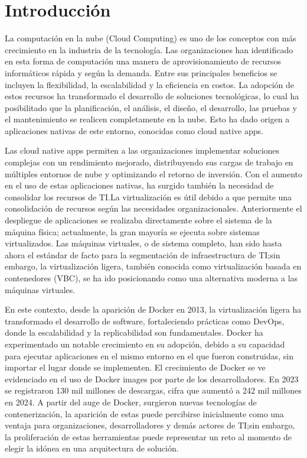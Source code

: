 \chapter*{Introducción}
La computación en la nube (Cloud Computing) es uno de los conceptos con más crecimiento en la industria de la tecnología\citep{Jayaweera2024}. Las organizaciones han identificado en esta forma de computación una manera de aprovisionamiento de recursos informáticos rápida y según la demanda. Entre sus principales beneficios se incluyen la flexibilidad, la escalabilidad y la eficiencia en costos\citep{Ahmadi2024}. La adopción de estos recursos ha transformado el desarrollo de soluciones tecnológicas, lo cual ha posibilitado que la planificación, el análisis, el diseño, el desarrollo, las pruebas y el mantenimiento se realicen completamente en la nube. Esto ha dado origen a aplicaciones nativas de este entorno, conocidas como cloud native apps.

Las cloud native apps permiten a las organizaciones implementar soluciones complejas con un rendimiento mejorado, distribuyendo sus cargas de trabajo en múltiples entornos de nube y optimizando el retorno de inversión\citep{Alonso2023}. Con el aumento en el uso de estas aplicaciones nativas, ha surgido también la necesidad de consolidar los recursos de TI.\@ La virtualización es útil debido a que permite una consolidación de recursos según las necesidades organizacionales. Anteriormente el despliegue de aplicaciones se realizaba directamente sobre el sistema de la máquina física; actualmente, la gran mayoría se ejecuta sobre sistemas virtualizados\citep{Jain2016}. Las máquinas virtuales, o de sistema completo, han sido hasta ahora el estándar de facto para la segmentación de infraestructura de TI;\@ sin embargo, la virtualización ligera, también conocida como virtualización basada en contenedores (VBC), se ha ido posicionando como una alternativa moderna a las máquinas virtuales.

En este contexto, desde la aparición de Docker en 2013, la virtualización ligera ha transformado el desarrollo de software, fortaleciendo prácticas como DevOps, donde la escalabilidad y la replicabilidad son fundamentales\citep{Docker2021}. Docker ha experimentado un notable crecimiento en su adopción, debido a su capacidad para ejecutar aplicaciones en el mismo entorno en el que fueron construidas, sin importar el lugar donde se implementen. El crecimiento de Docker se ve evidenciado en el uso de Docker images por parte de los desarrolladores. En 2023 se registraron 130 mil millones de descargas, cifra que aumentó a 242 mil millones en 2024\citep{Docker2024}. A partir del auge de Docker, surgieron nuevas tecnologías de contenerización, la aparición de estas puede percibirse inicialmente como una ventaja para organizaciones, desarrolladores y demás actores de TI;\@ sin embargo, la proliferación de estas herramientas puede representar un reto al momento de elegir la idónea en una arquitectura de solución.


